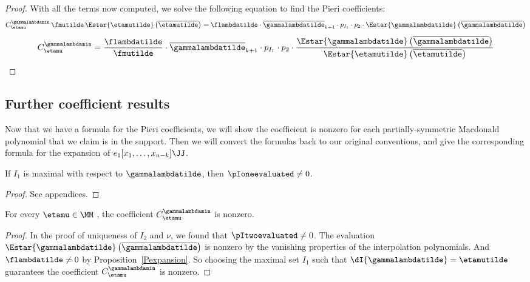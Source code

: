 \begin{proof}
With all the terms now computed, we solve the following equation to find the Pieri coefficients:
\[
    C^{\gammalambdamin}_{\etamu}\, \fmutilde \,\Estar{\etamutilde} \left( \overline{\etamutilde}\right) = \flambdatilde \cdot \overline{\gammalambdatilde}_{k+1} \cdot p_{I_1} \cdot p_{2} \cdot \Estar{\gammalambdatilde}\left(\overline{\gammalambdatilde} \right)\]
   \[ C^{\gammalambdamin}_{\etamu} = \frac{\flambdatilde}{\fmutilde} \cdot \overline{\gammalambdatilde}_{k+1} \cdot p_{I_1} \cdot p_{2} \cdot \frac{\Estar{\gammalambdatilde}\left(\overline{\gammalambdatilde} \right)}{\Estar{\etamutilde} \left( \overline{\etamutilde}\right)}\qedhere
\]
\end{proof}
\vspace*{.3cm}

    
    \subsection{Further coefficient results}
Now that we have a formula for the Pieri coefficients, we will show the coefficient is nonzero for each partially-symmetric Macdonald polynomial that we claim is in the support. Then we will convert the formulas back to our original conventions, and give the corresponding formula for the expansion of $e_1[x_1,\dots, x_{n-k}] \JJ$.



\begin{lemm}\label{nonzero}
If $I_1$ is maximal with respect to $\gammalambdatilde$, then $\pIoneevaluated \neq 0$.
\end{lemm}
\begin{proof}
    See appendices.
\end{proof}

\begin{coro}\label{support}
For every $\etamu \in \MM$ , the coefficient $C^{\gammalambdamin}_{\etamu}$ is nonzero.
\end{coro}
\begin{proof}
In the proof of uniqueness of $I_2$ and $\nu$, we found that $\pItwoevaluated \neq 0$. The evaluation $\Estar{\gammalambdatilde} \left(\overline{\gammalambdatilde} \right)$ is nonzero by the vanishing properties of the interpolation polynomials. And $\flambdatilde \neq 0$ by Proposition~\ref{Pexpansion}. So choosing the maximal set $I_1$ such that $\dI{\gammalambdatilde} = \etamutilde$ guarantees the coefficient $C^\gammalambdamin_{\etamu}$ is nonzero.
\end{proof}

